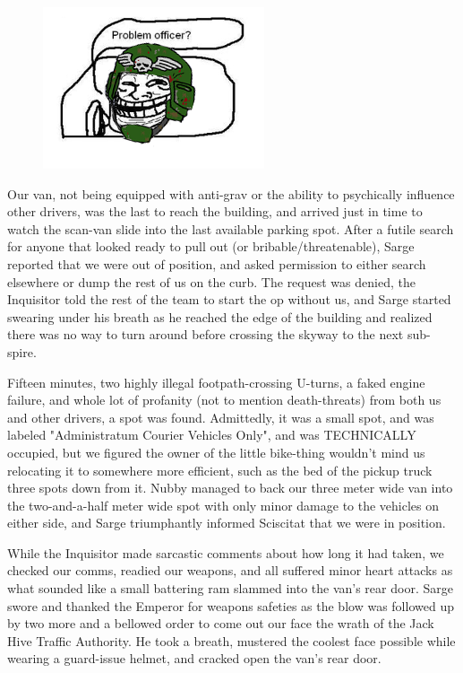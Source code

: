 \begin{figure}
	\begin{center}
		\includegraphics[width=\figwidth]{pics/17/37.png}
	\end{center}
\end{figure}
Our van, not being equipped with anti-grav or the ability to psychically influence other drivers, was the last to reach the building, and arrived just in time to watch the scan-van slide into the last available parking spot. 
After a futile search for anyone that looked ready to pull out (or bribable/threatenable), Sarge reported that we were out of position, and asked permission to either search elsewhere or dump the rest of us on the curb. 
The request was denied, the Inquisitor told the rest of the team to start the op without us, and Sarge started swearing under his breath as he reached the edge of the building and realized there was no way to turn around before crossing the skyway to the next sub-spire. 


Fifteen minutes, two highly illegal footpath-crossing U-turns, a faked engine failure, and whole lot of profanity (not to mention death-threats) from both us and other drivers, a spot was found. 
Admittedly, it was a small spot, and was labeled "Administratum Courier Vehicles Only", and was TECHNICALLY occupied, but we figured the owner of the little bike-thing wouldn't mind us relocating it to somewhere more efficient, such as the bed of the pickup truck three spots down from it. 
Nubby managed to back our three meter wide van into the two-and-a-half meter wide spot with only minor damage to the vehicles on either side, and Sarge triumphantly informed Sciscitat that we were in position. 


While the Inquisitor made sarcastic comments about how long it had taken, we checked our comms, readied our weapons, and all suffered minor heart attacks as what sounded like a small battering ram slammed into the van's rear door. 
Sarge swore and thanked the Emperor for weapons safeties as the blow was followed up by two more and a bellowed order to come out our face the wrath of the Jack Hive Traffic Authority. 
He took a breath, mustered the coolest face possible while wearing a guard-issue helmet, and cracked open the van's rear door.

